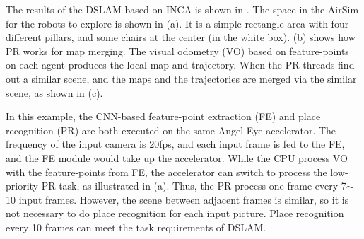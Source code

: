 The results of the DSLAM based on INCA is shown in . The space in the AirSim \cite{shah2018airsim} for the robots to explore is shown in (a). It is a simple rectangle area with four different pillars, and some chairs at the center (in the white box). (b) shows how PR works for map merging. The visual odometry (VO) based on feature-points on each agent produces the local map and trajectory. When the PR threads find out a similar scene, and the maps and the trajectories are merged via the similar scene, as shown in (c).

In this example, the CNN-based feature-point extraction (FE) and place recognition (PR) are both executed on the same Angel-Eye \cite{guo2017angel} accelerator. The frequency of the input camera is 20fps, and each input frame is fed to the FE, and the FE module would take up the accelerator. While the CPU process VO with the feature-points from FE, the accelerator can switch to process the low-priority PR task, as illustrated in (a). Thus, the PR process one frame every 7$\sim$10 input frames.
However, the scene between adjacent frames is similar, so it is not necessary to do place recognition for each input picture. Place recognition every 10 frames can meet the task requirements of DSLAM.